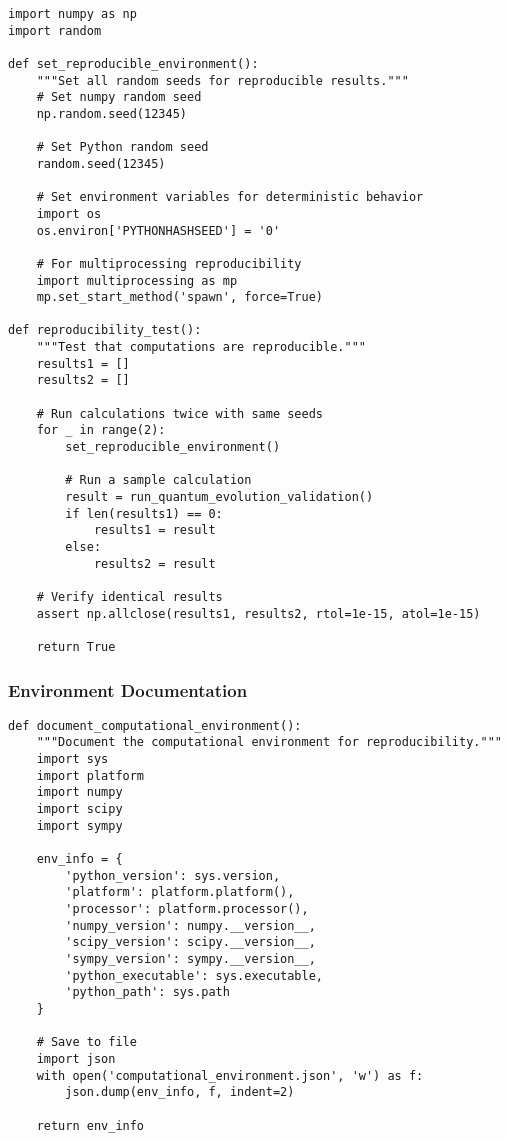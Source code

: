 \begin{verbatim}
import numpy as np
import random

def set_reproducible_environment():
    """Set all random seeds for reproducible results."""
    # Set numpy random seed
    np.random.seed(12345)
    
    # Set Python random seed
    random.seed(12345)
    
    # Set environment variables for deterministic behavior
    import os
    os.environ['PYTHONHASHSEED'] = '0'
    
    # For multiprocessing reproducibility
    import multiprocessing as mp
    mp.set_start_method('spawn', force=True)

def reproducibility_test():
    """Test that computations are reproducible."""
    results1 = []
    results2 = []
    
    # Run calculations twice with same seeds
    for _ in range(2):
        set_reproducible_environment()
        
        # Run a sample calculation
        result = run_quantum_evolution_validation()
        if len(results1) == 0:
            results1 = result
        else:
            results2 = result
    
    # Verify identical results
    assert np.allclose(results1, results2, rtol=1e-15, atol=1e-15)
    
    return True
\end{verbatim}

\subsubsection{Environment Documentation}

\begin{verbatim}
def document_computational_environment():
    """Document the computational environment for reproducibility."""
    import sys
    import platform
    import numpy
    import scipy
    import sympy
    
    env_info = {
        'python_version': sys.version,
        'platform': platform.platform(),
        'processor': platform.processor(),
        'numpy_version': numpy.__version__,
        'scipy_version': scipy.__version__,
        'sympy_version': sympy.__version__,
        'python_executable': sys.executable,
        'python_path': sys.path
    }
    
    # Save to file
    import json
    with open('computational_environment.json', 'w') as f:
        json.dump(env_info, f, indent=2)
    
    return env_info
\end{verbatim}

